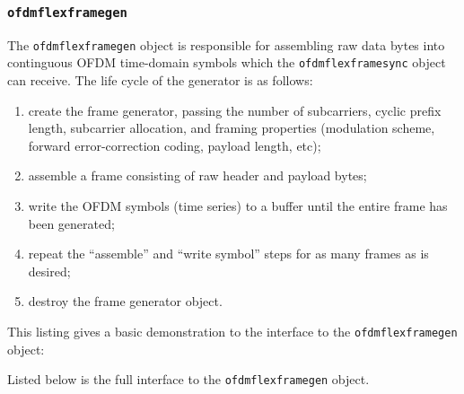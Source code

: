 \subsubsection{{\tt ofdmflexframegen}}
\label{module:framing:ofdmflexframe:gen}
%
The {\tt ofdmflexframegen} object is responsible for assembling raw data
bytes into continguous OFDM time-domain symbols which the
{\tt ofdmflexframesync} object can receive.
The life cycle of the generator is as follows:
%
\begin{enumerate}
\item create the frame generator, passing the number of subcarriers,
      cyclic prefix length, subcarrier allocation, and framing
      properties (modulation scheme, forward error-correction
      coding, payload length, etc);
\item assemble a frame consisting of raw header and payload bytes;
\item write the OFDM symbols (time series) to a buffer until the entire
      frame has been generated;
\item repeat the ``assemble'' and ``write symbol'' steps for as many
      frames as is desired;
\item destroy the frame generator object.
\end{enumerate}
%
This listing gives a basic demonstration to the interface to the
{\tt ofdmflexframegen} object:
%

%
Listed below is the full interface to the {\tt ofdmflexframegen}
object.
%
%
